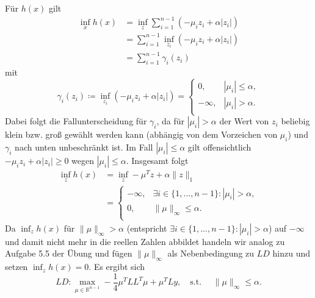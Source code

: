 \documentclass[ngerman, a4paper,12pt]{article}
\begin{document}
Für $h(x)$ gilt
\begin{equation*}
	\begin{split}
		\inf_x h(x)&=\inf_z \sum_{i=1}^{n-1}( -\mu_iz_i+\alpha|z_i|) \\
		  &= \sum_{i=1}^{n-1} \inf_{z_i} (-\mu_iz_i+\alpha|z_i|) \\
		  &= \sum_{i=1}^{n-1} \gamma_i (z_i)
		  \end{split}
\end{equation*}
mit 
\begin{equation*}
\gamma_i(z_i) \coloneqq \inf_{z_i}(-\mu_iz_i + \alpha |z_i|)= \begin{cases}
	0,& |\mu_i|\leq \alpha,\\
	-\infty,& |\mu_i|>\alpha.\\
\end{cases}
\end{equation*}
Dabei folgt die Fallunterscheidung für $\gamma_i$, da für $|\mu_i|>\alpha$ der Wert von $z_i$ beliebig klein bzw. groß gewählt werden kann (abhängig von dem Vorzeichen von $\mu_i$) und $\gamma_i$ nach unten unbeschränkt ist. Im Fall $|\mu_i|\leq \alpha$ gilt offensichtlich $-\mu_iz_i +\alpha|z_i| \geq 0$ wegen $|\mu_i| \leq \alpha$.
Insgesamt folgt 
\begin{equation*}
	\begin{split}
		\inf_z h(x) &=  \inf_{z} -\mu^Tz+\alpha\|z\|_1 \\
		&=\begin{cases}
		-\infty,&\exists i \in \{1,..., n-1\}:|\mu_i | >\alpha,\\
		0,&\|\mu\|_\infty\leq\alpha.\\
		\end{cases}
	\end{split}
\end{equation*}
Da $\inf_z h(x)$ für $\| \mu \|_{\infty} > \alpha $ (entspricht $\exists i \in \{1,..., n-1\}:|\mu_i | >\alpha$) auf $-\infty$ und damit nicht mehr in die reellen Zahlen abbildet handeln wir analog zu Aufgabe 5.5 der Übung und fügen $\| \mu \|_{\infty}$ als Nebenbedingung zu $LD$ hinzu und setzen $\inf_z h(x)=0$. Es ergibt sich
\begin{equation*}
  LD:  \max_{\mu \in \mathbb{R}^{n-1}} -\frac{1}{4}\mu^TLL^T\mu + \mu^TLy,\quad \text{s.t. } \quad \|\mu\|_\infty\leq\alpha.
\end{equation*}
\end{document}
